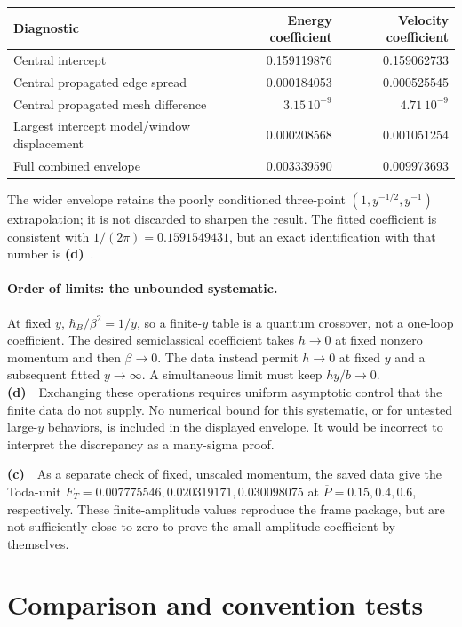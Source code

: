 \documentclass[11pt,a4paper]{article}
\newcommand{\Lc}{\textbf{(c)}\ }
\newcommand{\Ld}{\textbf{(d)}\ }
\begin{document}
\begin{center}\small
\begin{tabular}{lrr}
\toprule Diagnostic & Energy coefficient & Velocity coefficient\\\midrule
Central intercept & 0.159119876 & 0.159062733\\
Central propagated edge spread & 0.000184053 & 0.000525545\\
Central propagated mesh difference & $3.15\,10^{-9}$ & $4.71\,10^{-9}$\\
Largest intercept model/window displacement & 0.000208568 & 0.001051254\\
Full combined envelope & 0.003339590 & 0.009973693\\
\bottomrule
\end{tabular}
\end{center}
The wider envelope retains the poorly conditioned three-point
$(1,y^{-1/2},y^{-1})$ extrapolation; it is not discarded to sharpen the result.
The fitted coefficient is consistent with $1/(2\pi)=0.1591549431$,
but an exact identification with that number is \Ld.

\paragraph{Order of limits: the unbounded systematic.}
At fixed $y$, $\hbar_B/\beta^2=1/y$, so a finite-$y$ table is a quantum
crossover, not a one-loop coefficient. The desired semiclassical coefficient
takes $h\to0$ at fixed nonzero momentum and then $\beta\to0$.
The data instead permit $h\to0$ at fixed $y$ and a subsequent fitted
$y\to\infty$. A simultaneous limit must keep $hy/b\to0$.
\Ld\ Exchanging these operations requires uniform asymptotic control that
the finite data do not supply. No numerical bound for this systematic,
or for untested large-$y$ behaviors, is included in the displayed envelope.
It would be incorrect to interpret the discrepancy as a many-sigma proof.

\Lc\ As a separate check of fixed, unscaled momentum, the saved data give
the Toda-unit $F_T=0.007775546,0.020319171,0.030098075$ at
$\overline P=0.15,0.4,0.6$, respectively. These finite-amplitude values
reproduce the frame package, but are not sufficiently close to zero to
prove the small-amplitude coefficient by themselves.

\section{Comparison and convention tests}
\end{document}
